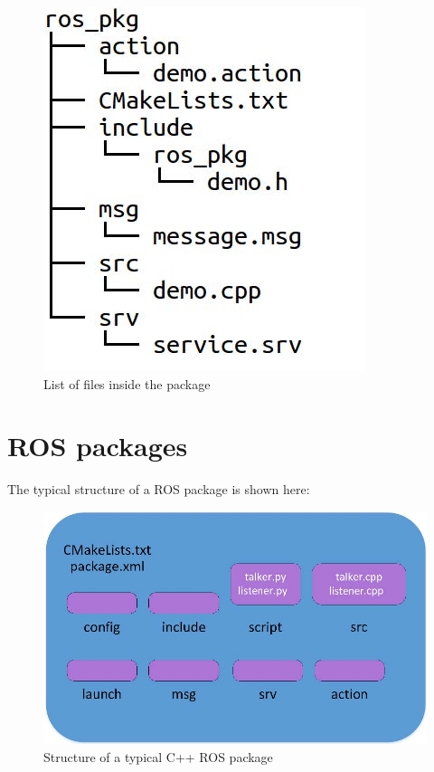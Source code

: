 \documentclass[../../main]{subfiles}
\begin{document}
\begin{figure}[ht]
    \centering
    \includegraphics{img/rosfile.jpg}
    \caption{List of files inside the package}
\end{figure}

\section{ROS packages}
The typical structure of a ROS package is shown here:
\begin{figure}[ht]
    \centering
    \includegraphics{img/rospkg.jpg}
    \caption{Structure of a typical C++ ROS package}
\end{figure}
\end{document}
